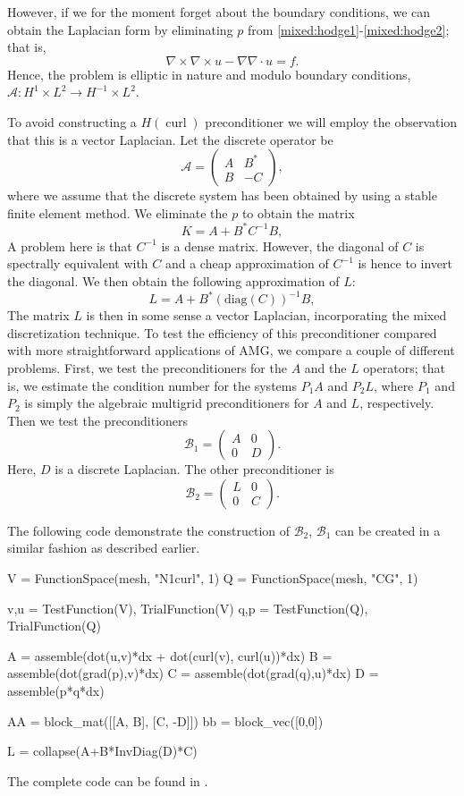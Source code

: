 However, if we for the moment forget about the boundary conditions,
we can obtain the Laplacian form  by eliminating $p$
from \eqref{mixed:hodge1}-\eqref{mixed:hodge2}; that is,
\[
\nabla \times \nabla \times u - \nabla \nabla \cdot u = f .
\]
Hence, the problem is elliptic
in nature and modulo boundary conditions,  $\mathcal{A}: H^1 \times L^2 \rightarrow  H^{-1} \times L^2$.

To avoid constructing a $H(\operatorname{curl})$ preconditioner we will employ
the observation that this is a vector Laplacian.
Let the discrete operator be
\[
\mathcal{A}  =
\begin{pmatrix} A & B^* \\ B & -C \end{pmatrix},
\]
where we assume that the discrete system has been obtained by using a stable finite
element method. We eliminate the $p$ to obtain the matrix
\[
K  = A +  B^* C^{-1} B,
\]
A problem here is that $C^{-1}$ is a dense matrix. However, the diagonal of $C$ is spectrally equivalent with $C$ and a cheap approximation of $C^{-1}$ is hence
to invert the diagonal. We then obtain the following approximation of $L$:
\[
L  = A +  B^* (\mathrm{diag}(C))^{-1} B,
\]
The matrix $L$ is then in some sense a vector Laplacian,
incorporating the mixed discretization technique.  To test the
efficiency of this preconditioner compared with more straightforward
applications of AMG, we compare a couple of different problems.
First, we test the preconditioners for the $A$ and the $L$
operators; that is, we estimate the condition number for the systems
$P_1 A$ and $P_2 L$, where $P_1$ and $P_2$ is simply the algebraic
multigrid preconditioners for $A$ and $L$, respectively.  Then we
test the preconditioners
\[
\mathcal{B}_1  =
\begin{pmatrix} A & 0  \\ 0  & D \end{pmatrix}.
\]
Here, $D$ is a discrete Laplacian. The other preconditioner is
\[
\mathcal{B}_2  =
\begin{pmatrix} L & 0  \\ 0  & C \end{pmatrix}.
\]

The following code demonstrate the construction of $\mathcal{B}_2$,
$\mathcal{B}_1$ can be created in a similar fashion as described earlier.
\begin{python}
V = FunctionSpace(mesh, "N1curl", 1)
Q = FunctionSpace(mesh, "CG", 1)

v,u = TestFunction(V), TrialFunction(V)
q,p = TestFunction(Q), TrialFunction(Q)

A = assemble(dot(u,v)*dx + dot(curl(v), curl(u))*dx)
B = assemble(dot(grad(p),v)*dx)
C = assemble(dot(grad(q),u)*dx)
D = assemble(p*q*dx)

AA = block_mat([[A,  B],
                [C, -D]])
bb = block_vec([0,0])

L = collapse(A+B*InvDiag(D)*C)
\end{python}
The complete code can be found in .

